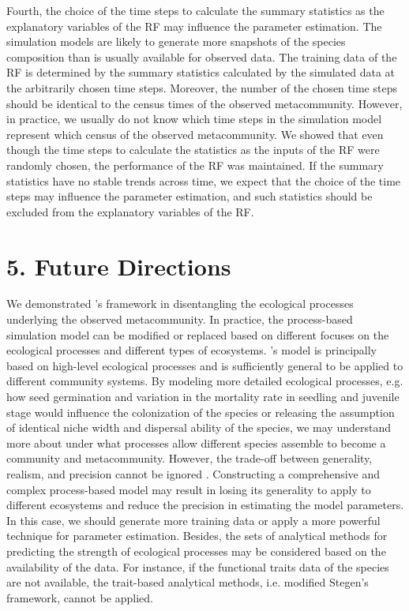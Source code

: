 Fourth, the choice of the time steps to calculate the summary statistics as the explanatory variables of the RF may influence the parameter estimation. The simulation models are likely to generate more snapshots of the species composition than is usually available for observed data. The training data of the RF is determined by the summary statistics calculated by the simulated data at the arbitrarily chosen time steps. Moreover, the number of the chosen time steps should be identical to the census times of the observed metacommunity. However, in practice, we usually do not know which time steps in the simulation model represent which census of the observed metacommunity. We showed that even though the time steps to calculate the statistics as the inputs of the RF were randomly chosen, the performance of the RF was maintained. If the summary statistics have no stable trends across time, we expect that the choice of the time steps may influence the parameter estimation, and such statistics should be excluded from the explanatory variables of the RF.

\chapter*{5. Future Directions}
\setcounter{chapter}{5}
\noindent
We demonstrated \citeauthor{guzman2022accounting}'s framework in disentangling the ecological processes underlying the observed metacommunity. In practice, the process-based simulation model can be modified or replaced based on different focuses on the ecological processes and different types of ecosystems. \citeauthor{thompson2020process}'s model is principally based on high-level ecological processes and is sufficiently general to be applied to different community systems. By modeling more detailed ecological processes, e.g. how seed germination and variation in the mortality rate in seedling and juvenile stage would influence the colonization of the species or releasing the assumption of identical niche width and dispersal ability of the species, we may understand more about under what processes allow different species assemble to become a community and metacommunity. However, the trade-off between generality, realism, and precision cannot be ignored \citep{levins1966strategy}. Constructing a comprehensive and complex process-based model may result in losing its generality to apply to different ecosystems and reduce the precision in estimating the model parameters. In this case, we should generate more training data or apply a more powerful technique for parameter estimation. Besides, the sets of analytical methods for predicting the strength of ecological processes may be considered based on the availability of the data. For instance, if the functional traits data of the species are not available, the trait-based analytical methods, i.e. modified Stegen's framework, cannot be applied. 

